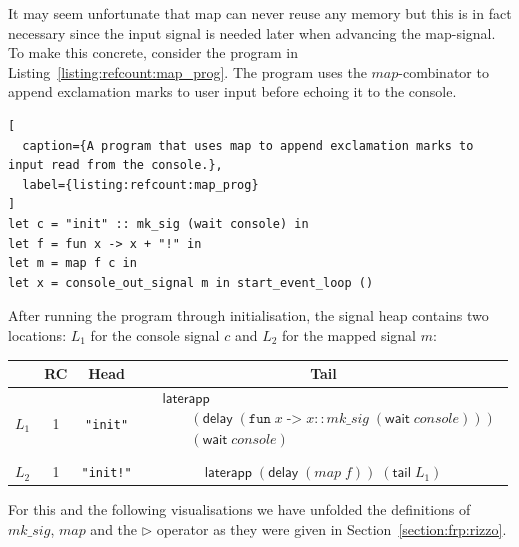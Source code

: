 It may seem unfortunate that map can never reuse any memory but this is in fact necessary since the input signal is needed later when advancing the map-signal.
To make this concrete, consider the program in Listing~\ref{listing:refcount:map_prog}. The program uses the $map$-combinator to append exclamation marks to user input before echoing it to the console.

\begin{lstlisting}[
  caption={A program that uses map to append exclamation marks to input read from the console.},
  label={listing:refcount:map_prog}
]
let c = "init" :: mk_sig (wait console) in
let f = fun x -> x + "!" in
let m = map f c in 
let x = console_out_signal m in start_event_loop ()
\end{lstlisting}

After running the program through initialisation, the signal heap contains two locations: $L_1$ for the console signal $c$ and $L_2$ for the mapped signal $m$:
\begin{center}
\begin{tabular}{ |c|c|c|c| } 
 \hline
  & RC & Head & Tail \\ 
 \hline
 $L_1$ & 1 & \texttt{"init"} &
  $
  \begin{aligned}
      &\mathsf{laterapp} \\
      &\qquad (\mathsf{delay} \; (\texttt{fun} \; x \; \texttt{->} \; x :: mk\_sig \; (\mathsf{wait} \; console))) \\
      &\qquad (\mathsf{wait} \; console) \\
  \end{aligned}
  $ \\
  \hline
  $L_2$ & 1 & \texttt{"init!"} &
  $\mathsf{laterapp}
    \; (\mathsf{delay} \; (map \; f))
    \; (\mathsf{tail} \; L_1)
  $ \\
 \hline
\end{tabular}
\end{center}
For this and the following visualisations we have unfolded the definitions of $mk\_sig$, $map$ and the $\triangleright$ operator as they were given in Section~\ref{section:frp:rizzo}.

